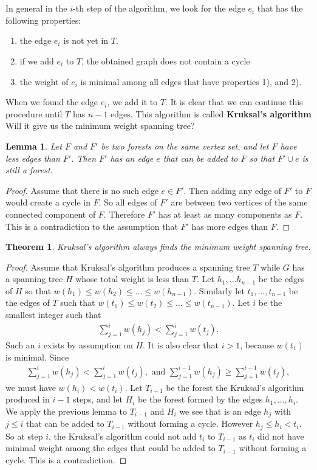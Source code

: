 \documentclass[12pt,a4paper]{article}
\newtheorem{lem}{Lemma}[section]
\newtheorem{thm}{Theorem}[section]
\theoremstyle{definition}
\begin{document}
\\\\
In general in the $i$-th step of the algorithm, we look for the edge $e_i$ that has the following properties:
\begin{enumerate}
\item the edge $e_i$ is not yet in $T$.
\item if we add $e_i$ to $T$, the obtained graph does not contain a cycle
\item the weight of $e_i$ is minimal among all edges that have properties 1), and 2).
\end{enumerate}
When we found the edge $e_i$, we add it to $T$. It is clear that we can continue this procedure until $T$ has $n-1$ edges. This algorithm is called \textbf{Kruksal's algorithm} Will it give us the minimum weight spanning tree?
\begin{lem} Let $F$ and $F'$ be two forests on the same vertex set, and let $F$ have less edges than $F'$. Then $F'$ has an edge $e$ that can be added to $F$ so that $F' \cup e$ is still a forest. 
\end{lem}
\begin{proof}
Assume that there is no such edge $e \in F'$. Then adding any edge of $F'$ to $F$ would create a cycle in $F$. So all edges of $F'$ are between two vertices of the same connected component of $F$. Therefore $F'$ has at least as many components as $F$. This is a contradiction to the assumption that $F'$ has more edges than $F$. 
\end{proof}
\begin{thm} Kruksal's algorithm always finds the minimum weight spanning tree. 
\end{thm}
\begin{proof}
Assume that Kruksal's algorithm produces a spanning tree $T$ while $G$ has a spanning tree $H$ whose total weight is less than $T$. Let $h_1, \dots h_{n-1}$ be the edges of $H$ so that $w(h_1) \leq w(h_2) \leq \dots \leq w(h_{n-1})$. Similarly let $t_1, \dots , t_{n-1}$ be the edges of $T$ such that $w(t_1) \leq w(t_2) \leq \dots \leq w(t_{n-1})$. Let $i$ be the smallest integer such that 
\begin{align*}
\sum_{j=1}^{i} w(h_j) < \sum_{j=1}^{i} w(t_j). 
\end{align*}
Such an $i$ exists by assumption on $H$. It is also clear that $i>1$,  because $w(t_1)$ is minimal. Since 
\begin{align*}
\sum_{j=1}^i w(h_j) < \sum_{j=1}^i w(t_j), \text{ and } \sum_{j=1}^{i-1} w(h_j) \geq \sum_{j=1}^{i-1} w(t_j),
\end{align*}
we must have $w(h_i) < w(t_i)$. Let $T_{i-1}$ be the forest the Kruksal's algorithm produced in $i-1$ steps, and let $H_i$ be the forest formed by the edges $h_1, \dots , h_i$. We apply the previous lemma to $T_{i-1}$ and $H_i$ we see that is an edge $h_j$ with $j \leq i$ that can be added to $T_{i-1}$ without forming a cycle. However $h_j \leq h_i < t_i$. So at step $i$, the Kruksal’s algorithm could not add  $t_i$ to $T_{i-1}$ as $t_i$ did not have minimal weight among the edges that could be added to $T_{i-1}$ without forming a cycle. This is a contradiction. 
\end{proof}
\end{document}

